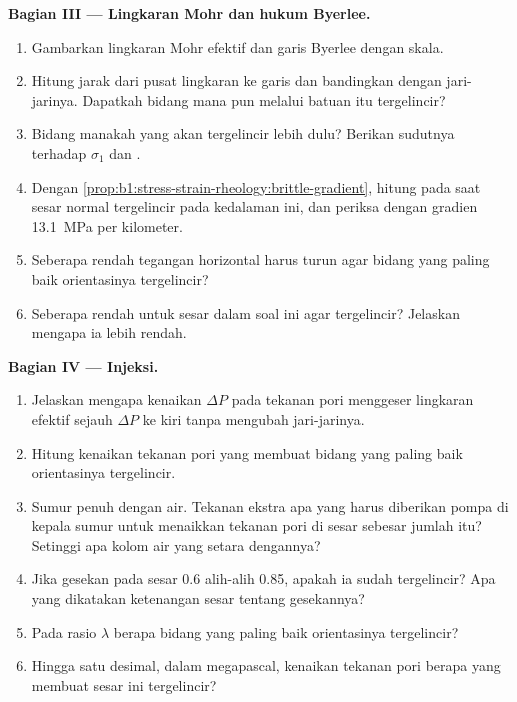 \begin{problem}
\medskip
\noindent\textbf{Bagian III --- Lingkaran Mohr dan hukum Byerlee.}
\begin{enumerate}[resume]
  \item Gambarkan lingkaran Mohr efektif dan garis Byerlee dengan skala.
  \item Hitung jarak dari pusat lingkaran ke garis dan bandingkan dengan jari-jarinya. Dapatkah bidang mana pun melalui batuan itu tergelincir?
  \item Bidang manakah yang akan tergelincir lebih dulu? Berikan sudutnya terhadap $\sigma_1$ dan .
  \item Dengan \cref{prop:b1:stress-strain-rheology:brittle-gradient}, hitung  pada saat sesar normal tergelincir pada kedalaman ini, dan periksa dengan gradien \qty{13.1}{MPa} per kilometer.
  \item Seberapa rendah tegangan horizontal harus turun agar bidang yang paling baik orientasinya tergelincir?
  \item Seberapa rendah untuk sesar dalam soal ini agar tergelincir? Jelaskan mengapa ia lebih rendah.
\end{enumerate}

\medskip
\noindent\textbf{Bagian IV --- Injeksi.}
\begin{enumerate}[resume]
  \item Jelaskan mengapa kenaikan $\Delta P$ pada tekanan pori menggeser lingkaran efektif sejauh $\Delta P$ ke kiri tanpa mengubah jari-jarinya.
  \item Hitung kenaikan tekanan pori yang membuat bidang yang paling baik orientasinya tergelincir.
  \item Sumur penuh dengan air. Tekanan ekstra apa yang harus diberikan pompa di kepala sumur untuk menaikkan tekanan pori di sesar sebesar jumlah itu? Setinggi apa kolom air yang setara dengannya?
  \item Jika gesekan pada sesar 0.6 alih-alih 0.85, apakah ia sudah tergelincir? Apa yang dikatakan ketenangan sesar tentang gesekannya?
  \item Pada rasio $\lambda$ berapa bidang yang paling baik orientasinya tergelincir?
  \item Hingga satu desimal, dalam megapascal, kenaikan tekanan pori berapa yang membuat sesar ini tergelincir?
\end{enumerate}
\end{problem}
